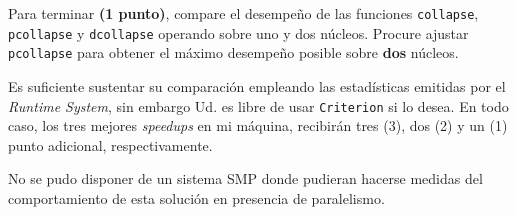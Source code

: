 \documentclass[11pt,fleqn]{article}
\newenvironment{answer}{%
  \def\FrameCommand{\fboxsep=\FrameSep \fcolorbox{black}{midgrey}}%
  \color{black}\MakeFramed {\FrameRestore}}%
 {\endMakeFramed}
\begin{document}
Para terminar \textbf{(1 punto)}, compare el desempeño de las funciones
\texttt{collapse}, \texttt{pcollapse} y \texttt{dcollapse} operando sobre
uno y dos núcleos. Procure ajustar \texttt{pcollapse} para obtener el máximo
desempeño posible sobre \textbf{dos} núcleos.

Es suficiente sustentar su comparación empleando las estadísticas emitidas
por el \emph{Runtime System}, sin embargo Ud. es libre de usar
\texttt{Criterion} si lo desea. En todo caso, los tres mejores
\emph{speedups} en mi máquina, recibirán tres (3), dos (2) y un (1) punto
adicional, respectivamente.

\begin{answer}
  No se pudo disponer de un sistema SMP donde pudieran hacerse medidas
  del comportamiento de esta solución en presencia de paralelismo.
\end{answer}
\end{document}
